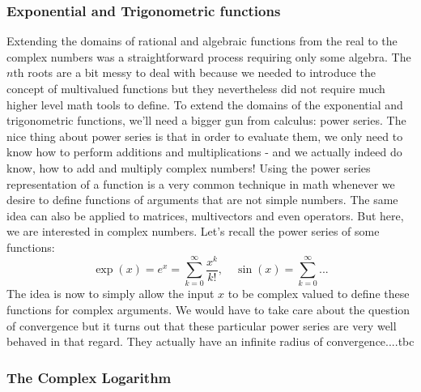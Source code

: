 

\subsubsection{Exponential and Trigonometric functions}
Extending the domains of rational and algebraic functions from the real to the complex numbers was a straightforward process requiring only some algebra. The $n$th roots are a bit messy to deal with because we needed to introduce the concept of multivalued functions but they nevertheless did not require much higher level math tools to define. To extend the domains of the exponential and trigonometric functions, we'll need a bigger gun from calculus: power series. The nice thing about power series is that in order to evaluate them, we only need to know how to perform additions and multiplications - and we actually indeed do know, how to add and multiply complex numbers! Using the power series representation of a function is a very common technique in math whenever we desire to define functions of arguments that are not simple numbers. The same idea can also be applied to matrices, multivectors and even operators. But here, we are interested in complex numbers. Let's recall the power series of some functions:
\begin{equation}
 \exp(x) = e^x = \sum_{k=0}^{\infty} \frac{x^k}{k!}, \quad
 \sin(x) =  \sum_{k=0}^{\infty} ...
\end{equation}
The idea is now to simply allow the input $x$ to be complex valued to define these functions for complex arguments. We would have to take care about the question of convergence but it turns out that these particular power series are very well behaved in that regard. They actually have an infinite radius of convergence....tbc



\subsubsection{The Complex Logarithm}


